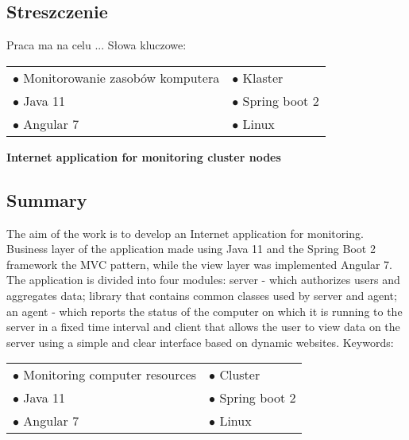 \thispagestyle{empty}
\makeatletter
\begin{center}
	\large \textbf{\@title}
\end{center} 
\makeatother

\subsection*{Streszczenie}
Praca ma na celu ... \newline
Słowa kluczowe:
\begin{table}[!h]
\label{kluczowe}
\begin{tabular}{l l}

$\bullet$ Monitorowanie zasobów komputera       &       $\bullet$ Klaster \\
$\bullet$ Java 11                               &       $\bullet$ Spring boot 2 \\
$\bullet$ Angular 7                             &       $\bullet$ Linux \\

\end{tabular}
\end{table}

\makeatletter
\begin{center}
	\large \textbf{Internet application for monitoring cluster nodes}
\end{center} 
\makeatother

\subsection*{Summary}
The aim of the work is to develop an Internet application for monitoring.
Business layer of the application 
 made using Java 11 and the Spring Boot 2 framework  the MVC pattern, while the view layer was implemented Angular 7.
The application is divided into four modules: server - which authorizes users and aggregates data;
library that contains common classes used by server and agent;
an agent - which reports the status of the computer on which it is running to the server in a fixed time interval
and client that allows the user to view data on the server using a simple and clear interface based on dynamic websites.
\newline
Keywords:

\begin{table}[!h]
\label{keyword}
\begin{tabular}{l l}

$\bullet$ Monitoring computer resources         &       $\bullet$ Cluster \\
$\bullet$ Java 11                               &       $\bullet$ Spring boot 2 \\
$\bullet$ Angular 7                             &       $\bullet$ Linux \\

\end{tabular}
\end{table}